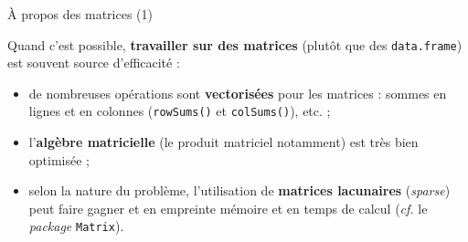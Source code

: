 \documentclass[12pt,ignorenonframetext,]{beamer}
\providecommand{\tightlist}{%
  \setlength{\itemsep}{0pt}\setlength{\parskip}{0pt}}
\begin{document}
\begin{frame}[fragile]{À propos des matrices (1)}
\protect\hypertarget{a-propos-des-matrices-1}{}

Quand c’est possible, \textbf{travailler sur des matrices} (plutôt que
des \texttt{data.frame}) est souvent source d’efficacité :

\vfill

\begin{itemize}
\tightlist
\item
  \pause de nombreuses opérations sont \textbf{vectorisées} pour les
  matrices : sommes en lignes et en colonnes (\texttt{rowSums()} et
  \texttt{colSums()}), etc. ;
\end{itemize}

\vfill

\begin{itemize}
\tightlist
\item
  \pause l’\textbf{algèbre matricielle} (le produit matriciel notamment)
  est très bien optimisée ;
\end{itemize}

\vfill

\begin{itemize}
\tightlist
\item
  \pause selon la nature du problème, l’utilisation de \textbf{matrices
  lacunaires} (\emph{sparse}) peut faire gagner et en empreinte mémoire
  et en temps de calcul (\emph{cf.} le \emph{package} \texttt{Matrix}).
\end{itemize}

\end{frame}
\end{document}
